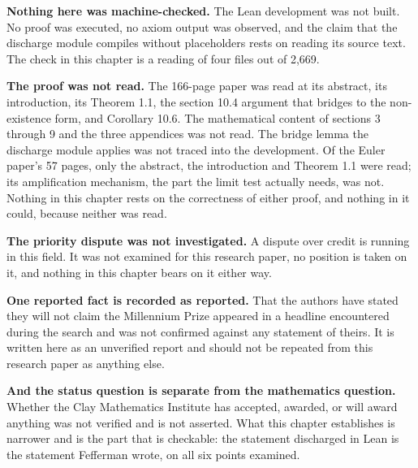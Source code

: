 \textbf{Nothing here was machine-checked.} The Lean development was not built. No proof was
executed, no axiom output was observed, and the claim that the discharge module compiles without
placeholders rests on reading its source text. The check in this chapter
is a reading of four files out of 2{,}669.

\textbf{The proof was not read.} The 166-page paper was read at its abstract, its introduction, its
Theorem 1.1, the section 10.4 argument that bridges to the non-existence form, and Corollary 10.6.
The mathematical content of sections 3 through 9 and the three appendices was not read. The bridge
lemma the discharge module applies was not traced into the development. Of the Euler paper's 57
pages, only the abstract, the introduction and Theorem 1.1 were read; its amplification
mechanism, the part the limit test actually needs, was not. Nothing in this chapter rests
on the correctness of either proof, and nothing in it could, because neither was read.

\textbf{The priority dispute was not investigated.} A dispute over credit is running in this field.
It was not examined for this research paper, no position is taken on it, and nothing in this chapter bears on
it either way.

\textbf{One reported fact is recorded as reported.} That the authors have stated they will not claim
the Millennium Prize appeared in a headline encountered during the search and was not confirmed
against any statement of theirs. It is written here as an unverified report and should not be
repeated from this research paper as anything else.

\textbf{And the status question is separate from the mathematics question.} Whether the Clay
Mathematics Institute has accepted, awarded, or will award anything was not verified and is not
asserted. What this chapter establishes is narrower and is the part that is checkable: the
statement discharged in Lean is the statement Fefferman wrote, on all six points examined.
